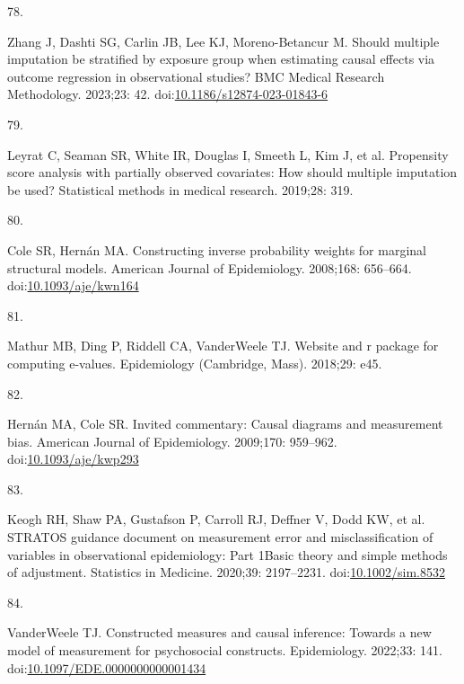 \documentclass[
  singlecolumn]{article}
\newlength{\cslhangindent}
\newlength{\csllabelwidth}
\newlength{\cslentryspacingunit} %
\newenvironment{CSLReferences}[2] %
 {%
  \setlength{\parindent}{0pt}
  \ifodd #1
  \let\oldpar\par
  \def\par{\hangindent=\cslhangindent\oldpar}
  \fi
  \setlength{\parskip}{#2\cslentryspacingunit}
 }%
 {}
\newcommand{\CSLLeftMargin}[1]{\parbox[t]{\csllabelwidth}{#1}}
\newcommand{\CSLRightInline}[1]{\parbox[t]{\linewidth - \csllabelwidth}{#1}\break}
\begin{document}
\begin{CSLReferences}{0}{0}
\leavevmode{}%
\CSLLeftMargin{78. }%
\CSLRightInline{Zhang J, Dashti SG, Carlin JB, Lee KJ, Moreno-Betancur
M. Should multiple imputation be stratified by exposure group when
estimating causal effects via outcome regression in observational
studies? BMC Medical Research Methodology. 2023;23: 42.
doi:\href{https://doi.org/10.1186/s12874-023-01843-6}{10.1186/s12874-023-01843-6}}

\leavevmode{}%
\CSLLeftMargin{79. }%
\CSLRightInline{Leyrat C, Seaman SR, White IR, Douglas I, Smeeth L, Kim
J, et al. Propensity score analysis with partially observed covariates:
How should multiple imputation be used? Statistical methods in medical
research. 2019;28: 319. }

\leavevmode{}%
\CSLLeftMargin{80. }%
\CSLRightInline{Cole SR, Hernán MA. Constructing inverse probability
weights for marginal structural models. American Journal of
Epidemiology. 2008;168: 656--664.
doi:\href{https://doi.org/10.1093/aje/kwn164}{10.1093/aje/kwn164}}

\leavevmode{}%
\CSLLeftMargin{81. }%
\CSLRightInline{Mathur MB, Ding P, Riddell CA, VanderWeele TJ. Website
and r package for computing e-values. Epidemiology (Cambridge, Mass).
2018;29: e45. }

\leavevmode{}%
\CSLLeftMargin{82. }%
\CSLRightInline{Hernán MA, Cole SR. Invited commentary: Causal diagrams
and measurement bias. American Journal of Epidemiology. 2009;170:
959--962.
doi:\href{https://doi.org/10.1093/aje/kwp293}{10.1093/aje/kwp293}}

\leavevmode{}%
\CSLLeftMargin{83. }%
\CSLRightInline{Keogh RH, Shaw PA, Gustafson P, Carroll RJ, Deffner V,
Dodd KW, et al. STRATOS guidance document on measurement error and
misclassification of variables in observational epidemiology: Part
1{\textemdash}Basic theory and simple methods of adjustment. Statistics
in Medicine. 2020;39: 2197--2231.
doi:\href{https://doi.org/10.1002/sim.8532}{10.1002/sim.8532}}

\leavevmode{}%
\CSLLeftMargin{84. }%
\CSLRightInline{VanderWeele TJ. Constructed measures and causal
inference: Towards a new model of measurement for psychosocial
constructs. Epidemiology. 2022;33: 141.
doi:\href{https://doi.org/10.1097/EDE.0000000000001434}{10.1097/EDE.0000000000001434}}


\end{CSLReferences}
\end{document}
